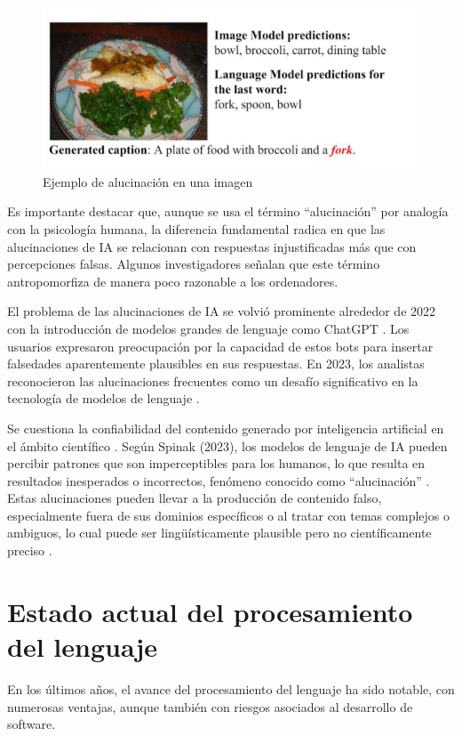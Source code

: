 \begin{figure}[h]
	\centering
	\includegraphics[scale=0.6]{Imagenes/alucinacionImagenes}
	\caption{Ejemplo de alucinación en una imagen \cite{rohrbach2023object}}
	\label{img:alucinacion2}
\end{figure}
Es importante destacar que, aunque se usa el término ``alucinación'' por analogía con la psicología humana, la diferencia fundamental radica en que las alucinaciones de IA se relacionan con respuestas injustificadas más que con percepciones falsas. Algunos investigadores señalan que este término antropomorfiza de manera poco razonable a los ordenadores.

El problema de las alucinaciones de IA se volvió prominente alrededor de 2022 con la introducción de modelos grandes de lenguaje como ChatGPT \citep{zhuo2023exploring}. Los usuarios expresaron preocupación por la capacidad de estos bots para insertar falsedades aparentemente plausibles en sus respuestas. En 2023, los analistas reconocieron las alucinaciones frecuentes como un desafío significativo en la tecnología de modelos de lenguaje \citep{leswing2023microsoft}.

Se cuestiona la confiabilidad del contenido generado por inteligencia artificial en el ámbito científico \citep{machinmastromatteo2023implicaciones}. Según Spinak (2023), los modelos de lenguaje de IA pueden percibir patrones que son imperceptibles para los humanos, lo que resulta en resultados inesperados o incorrectos, fenómeno conocido como ``alucinación'' \citep{spinak2023alucinaciones}. Estas alucinaciones pueden llevar a la producción de contenido falso, especialmente fuera de sus dominios específicos o al tratar con temas complejos o ambiguos, lo cual puede ser lingüísticamente plausible pero no científicamente preciso \citep{sage2023chatgpt}.

\section{Estado actual del procesamiento del lenguaje}
En los últimos años, el avance del procesamiento del lenguaje ha sido notable, con numerosas ventajas, aunque también con riesgos asociados al desarrollo de software.


